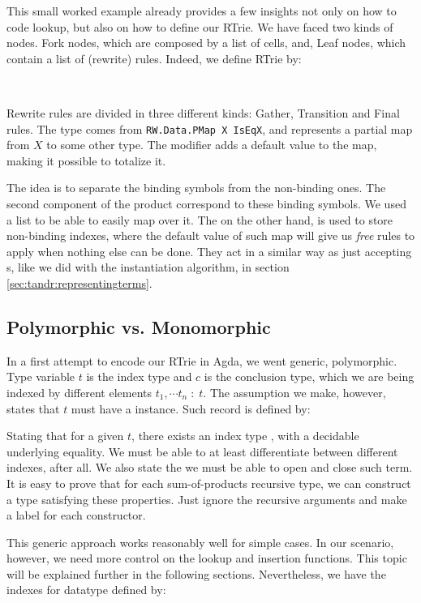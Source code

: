 This small worked example already provides a few insights not only on how to code lookup, but
also on how to define our RTrie. We have faced two kinds of nodes. Fork nodes, which
are composed by a list of cells, and, Leaf nodes, which contain a list of (rewrite) rules.
Indeed, we define RTrie by:

\\

Rewrite rules are divided in three different kinds: Gather, Transition and Final rules.
The type  comes from \texttt{\scriptsize RW.Data.PMap X IsEqX}, and represents a partial map
from $X$ to some other type. The  modifier adds a default value to the map, making
it possible to totalize it.

The idea is to separate the binding symbols from the non-binding ones. The second component of the
 product correspond to these binding symbols. We used a list to be able to easily map
over it. The  on the other hand, is used to store non-binding indexes, where the
default value of such map will give us \emph{free} rules to apply when nothing else can be done.
They act in a similar way as just accepting s, like we did with the instantiation
algorithm, in section \ref{sec:tandr:representingterms}.

\subsection{Polymorphic vs. Monomorphic}

In a first attempt to encode our RTrie in Agda, we went generic, polymorphic. Type variable $t$ is the index 
type and $c$ is the conclusion type, which we are being indexed by different
elements $t_1, \cdots t_n\; :\; t$. The assumption we make, however, states that $t$ must
have a  instance. Such record is defined by:


Stating that for a given $t$, there exists an index type , with a decidable
underlying equality. We must be able to at least differentiate between different indexes, after all.
We also state the we must be able to open and close such term. It is easy to prove that for each
sum-of-products recursive type, we can construct a type  satisfying these properties.
Just ignore the recursive arguments and make a label for each constructor.

This generic approach works reasonably well for simple cases. In our scenario, however,
we need more control on the lookup and insertion functions. This topic will be explained further
in the following sections. Nevertheless, we have the indexes for  datatype defined by:

